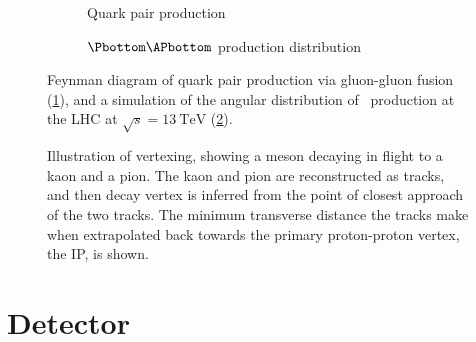 \begin{figure}
  \begin{subfigure}[b]{0.4\textwidth}
    \centering
    
    \caption{Quark pair production}
    \label{fig:intro:lhcb:hf_production:gg_fusion}
  \end{subfigure}
  \begin{subfigure}[b]{0.6\textwidth}
    
    \caption{$\Pbottom\APbottom$ production distribution}
    \label{fig:intro:lhcb:hf_production:bbbar_angles}
  \end{subfigure}
  \caption{%
    Feynman diagram of quark pair production via gluon-gluon fusion 
    (\ref{fig:intro:lhcb:hf_production:gg_fusion}), and a simulation of the 
    angular distribution of \bbbar\ production at the \ac{LHC} at $\sqrt{s} = 
    \SI{13}{\TeV}$ (\ref{fig:intro:lhcb:hf_production:bbbar_angles}).
  }
  \label{fig:intro:lhcb:hf_production}
\end{figure}

\begin{figure}
  \centering
  
  \caption{%
    Illustration of vertexing, showing a \PDz meson decaying in flight to a 
    kaon and a pion.
    The kaon and pion are reconstructed as tracks, and then \PDz decay vertex 
    is inferred from the point of closest approach of the two tracks.
    The minimum transverse distance the tracks make when extrapolated back 
    towards the primary proton-proton vertex, the \acf{IP}, is shown.
  }
  \label{fig:intro:lhcb:vertexing}
\end{figure}



\section{Detector}
\label{chap:intro:lhcb:detector}

